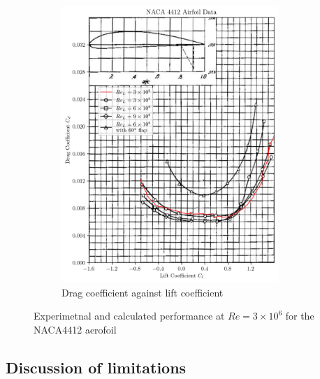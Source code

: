 \documentclass{article}
\begin{document}
\begin{figure}[H]
\begin{subfigure}{0.45\textwidth}
        \includegraphics[width=0.9\textwidth]{figures/NACA4412_drag_validation.png}
        \caption{Drag coefficient against lift coefficient}
        \label{fig:4412_drag_validation}
    \end{subfigure}
    \caption{Experimetnal and calculated performance at $Re = 3\times10^6$ for the NACA4412 aerofoil}
\end{figure}

\subsection{Discussion of limitations}

\end{document}
